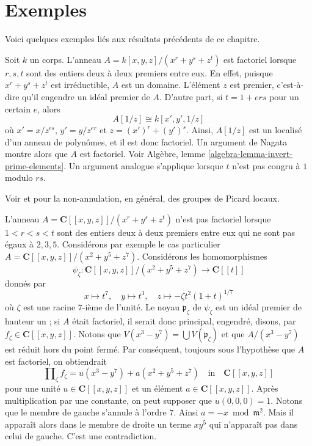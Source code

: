 \section{Exemples}
\label{section-examples}

\noindent
Voici quelques exemples liés aux résultats précédents de ce chapitre.

\begin{example}
\label{example-factorial}
\begin{reference}
\cite[4(c)]{Samuel-UFD}
\end{reference}
Soit $k$ un corps. L'anneau $A = k[x, y, z]/(x^r + y^s + z^t)$ est factoriel
lorsque $r, s, t$ sont des entiers deux à deux premiers entre eux.
En effet, puisque $x^r + y^s + z^t$ est irréductible, $A$ est un domaine.
L'élément $z$ est premier, c'est-à-dire qu'il engendre un idéal premier de
$A$. D'autre part, si $t = 1 + ers$ pour un certain $e$, alors
$$
A[1/z] \cong k[x', y', 1/z]
$$
où $x' = x/z^{es}$, $y' = y/z^{er}$ et $z = (x')^r + (y')^s$.
Ainsi, $A[1/z]$ est un localisé d'un anneau de polynômes, et il est donc
factoriel. Un argument de Nagata montre alors que $A$ est factoriel.
Voir Algèbre, lemme \ref{algebra-lemma-invert-prime-elements}.
Un argument analogue s'applique lorsque $t$ n'est pas congru à $1$ modulo
$rs$.
\end{example}

\begin{example}
\label{example-completion-not-factorial}
\begin{reference}
Voir \cite{Brieskorn} et \cite{Lipman-rational} pour la non-annulation, en
général, des groupes de Picard locaux.
\end{reference}
L'anneau $A = \mathbf{C}[[x, y, z]]/(x^r + y^s + z^t)$ n'est pas factoriel
lorsque $1 < r < s < t$ sont des entiers deux à deux premiers entre eux qui
ne sont pas égaux à $2, 3, 5$. Considérons par exemple le cas particulier
$A = \mathbf{C}[[x, y, z]]/(x^2 + y^5 + z^7)$.
Considérons les homomorphismes
$$
\psi_\zeta : \mathbf{C}[[x, y, z]]/(x^2 + y^5 + z^7) \to \mathbf{C}[[t]]
$$
donnés par
$$
x \mapsto t^7,\quad
y \mapsto t^3,\quad
z \mapsto -\zeta t^2(1 + t)^{1/7}
$$
où $\zeta$ est une racine $7$-ième de l'unité. Le noyau
$\mathfrak p_\zeta$ de $\psi_\zeta$ est un idéal premier de hauteur un ; si
$A$ était factoriel, il serait donc principal, engendré, disons, par
$f_\zeta \in \mathbf{C}[[x, y, z]]$.
Notons que $V(x^3 - y^7) = \bigcup V(\mathfrak p_\zeta)$ et que
$A/(x^3 - y^7)$ est réduit hors du point fermé. Par conséquent, toujours sous
l'hypothèse que $A$ est factoriel, on obtiendrait
$$
\prod\nolimits_\zeta f_\zeta = u(x^3 - y^7) + a(x^2 + y^5 + z^7)
\quad\text{in}\quad
\mathbf{C}[[x, y, z]]
$$
pour une unité $u \in \mathbf{C}[[x, y, z]]$ et un élément
$a \in \mathbf{C}[[x, y, z]]$. Après multiplication par une constante, on
peut supposer que $u(0, 0, 0) = 1$. Notons que le membre de gauche s'annule à
l'ordre $7$. Ainsi $a = - x \bmod \mathfrak m^2$. Mais il apparaît alors dans
le membre de droite un terme $xy^5$ qui n'apparaît pas dans celui de gauche.
C'est une contradiction.
\end{example}

